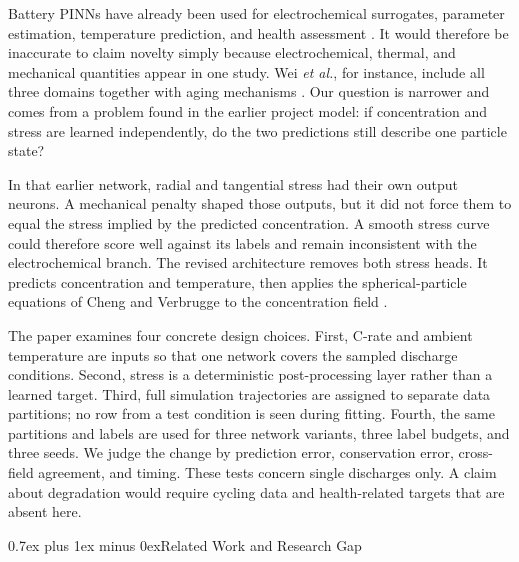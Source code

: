 \documentclass[conference]{IEEEtran}
\makeatletter
\newcommand{\headingfont}{\rmfamily}
\def\section{\@startsection{section}{1}{\z@}{1.5ex plus 1.5ex minus 0.5ex}%
{0.7ex plus 1ex minus 0ex}{\normalfont\headingfont\large\centering\bfseries}}
\makeatother
\begin{document}
Battery PINNs have already been used for electrochemical surrogates, parameter estimation, temperature prediction, and health assessment \cite{hassanaly2024part1,hassanaly2024part2,wang2023temperature,wang2024parameter}. It would therefore be inaccurate to claim novelty simply because electrochemical, thermal, and mechanical quantities appear in one study. Wei \emph{et al.}, for instance, include all three domains together with aging mechanisms \cite{wei2026etm}. Our question is narrower and comes from a problem found in the earlier project model: if concentration and stress are learned independently, do the two predictions still describe one particle state?

In that earlier network, radial and tangential stress had their own output neurons. A mechanical penalty shaped those outputs, but it did not force them to equal the stress implied by the predicted concentration. A smooth stress curve could therefore score well against its labels and remain inconsistent with the electrochemical branch. The revised architecture removes both stress heads. It predicts concentration and temperature, then applies the spherical-particle equations of Cheng and Verbrugge to the concentration field \cite{cheng2009stress}.

The paper examines four concrete design choices. First, C-rate and ambient temperature are inputs so that one network covers the sampled discharge conditions. Second, stress is a deterministic post-processing layer rather than a learned target. Third, full simulation trajectories are assigned to separate data partitions; no row from a test condition is seen during fitting. Fourth, the same partitions and labels are used for three network variants, three label budgets, and three seeds. We judge the change by prediction error, conservation error, cross-field agreement, and timing. These tests concern single discharges only. A claim about degradation would require cycling data and health-related targets that are absent here.

\section{Related Work and Research Gap}
\end{document}

